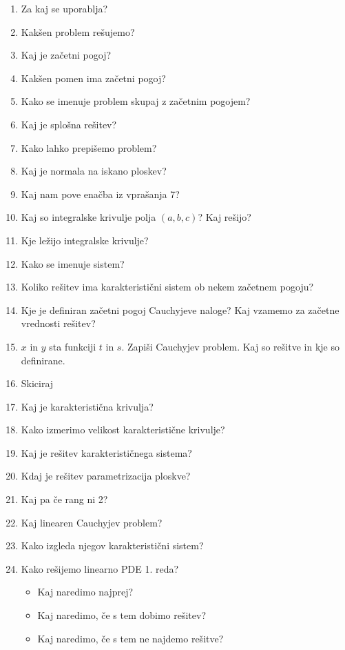 \documentclass{article}
\begin{document}
    \begin{enumerate}
        \item Za kaj se uporablja?
        \item Kakšen problem rešujemo?
        \item Kaj je začetni pogoj?
        \item Kakšen pomen ima začetni pogoj?
        \item Kako se imenuje problem skupaj z začetnim pogojem?
        \item Kaj je splošna rešitev?
        \item Kako lahko prepišemo problem?
        \item Kaj je normala na iskano ploskev?
        \item Kaj nam pove enačba iz vprašanja 7?
        \item Kaj so integralske krivulje polja $(a, b, c)$? Kaj rešijo?
        \item Kje ležijo integralske krivulje?
        \item Kako se imenuje sistem?
        \item Koliko rešitev ima karakteristični sistem ob nekem začetnem pogoju?
        \item Kje je definiran začetni pogoj Cauchyjeve naloge? Kaj vzamemo za začetne vrednosti rešitev?
        \item $x$ in $y$ sta funkciji $t$ in $s$. Zapiši Cauchyjev problem. Kaj so rešitve in kje so definirane.
        \item Skiciraj
        \item Kaj je karakteristična krivulja?
        \item Kako izmerimo velikost karakteristične krivulje?
        \item Kaj je rešitev karakterističnega sistema?
        \item Kdaj je rešitev parametrizacija ploskve?
        \item Kaj pa če rang ni 2?
        \item Kaj linearen Cauchyjev problem?
        \item Kako izgleda njegov karakteristični sistem?
        \item Kako rešijemo linearno PDE 1. reda?
        \begin{itemize}
            \item Kaj naredimo najprej?
            \item Kaj naredimo, če s tem dobimo rešitev?
            \item Kaj naredimo, če s tem ne najdemo rešitve?
        \end{itemize}
    \end{enumerate}
\end{document}
